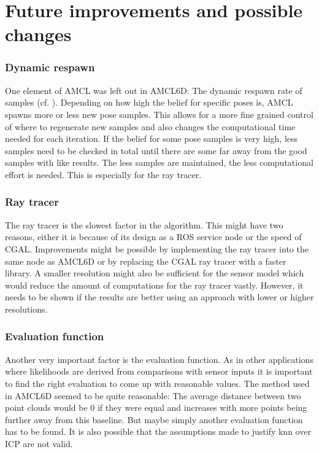 \documentclass[Thesis.tex]{subfiles}
\begin{document}
\chapter{Future improvements and possible changes}

\subsection*{Dynamic respawn}

One element of \gls{AMCL} was left out in \gls{AMCL6D}: The dynamic respawn rate of samples (cf. \citet{ThrunBurgardFox:2005}). Depending on how high the belief for specific poses is, \gls{AMCL} spawns more or less new pose samples. This allows for a more fine grained control of where to regenerate new samples and also changes the computational time needed for each iteration. If the belief for some pose samples is very high, less samples need to be checked in total until there are some far away from the good samples with like results. The less samples are maintained, the less computational effort is needed. This is especially for the ray tracer.

\subsection*{Ray tracer}

The ray tracer is the slowest factor in the algorithm. This might have two reasons, either it is because of its design as a \gls{ROS} service node or the speed of \gls{CGAL}. Improvements might be possible by implementing the ray tracer into the same node as \gls{AMCL6D} or by replacing the \gls{CGAL} ray tracer with a faster library. A smaller resolution might also be sufficient for the sensor model which would reduce the amount of computations for the ray tracer vastly. However, it needs to be shown if the results are better using an approach with lower or higher resolutions.

\subsection*{Evaluation function}

Another very important factor is the evaluation function. As in other applications where likelihoods are derived from comparisons with sensor inputs it is important to find the right evaluation to come up with reasonable values. The method used in \gls{AMCL6D} seemed to be quite reasonable: The average distance between two point clouds would be 0 if they were equal and increases with more points being further away from this baseline. But maybe simply another evaluation function has to be found. It is also possible that the assumptions made to justify \gls{knn} over \gls{ICP} are not valid. 
\end{document}
